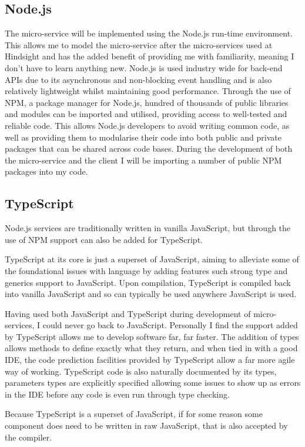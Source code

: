\subsection{Node.js}
The micro-service will be implemented using the Node.js run-time environment. This allows me to model the micro-service after the micro-services used at Hindsight and has the added benefit of providing me with familiarity, meaning I don't have to learn anything new. Node.js is used industry wide for back-end APIs due to its asynchronous and non-blocking event handling and is also relatively lightweight whilst maintaining good performance. Through the use of NPM, a package manager for Node.js, hundred of thousands of public libraries and modules can be imported and utilised, providing access to well-tested and reliable code. This allows Node.js developers to avoid writing common code, as well as providing them to modularise their code into both public and private packages that can be shared across code bases. During the development of both the micro-service and the client I will be importing a number of public NPM packages into my code.

\subsection{TypeScript}
Node.js services are traditionally written in vanilla JavaScript, but through the use of NPM support can also be added for TypeScript.

TypeScript at its core is just a superset of JavaScript, aiming to alleviate some of the foundational issues with language by adding features such strong type and generics support to JavaScript. Upon compilation, TypeScript is compiled back into vanilla JavaScript and so can typically be used anywhere JavaScript is used.

Having used both JavaScript and TypeScript during development of micro-services, I could never go back to JavaScript. Personally I find the support added by TypeScript allows me to develop software far, far faster. The addition of types allows methods to define exactly what they return, and when tied in with a good IDE, the code prediction facilities provided by TypeScript allow a far more agile way of working. TypeScript code is also naturally documented by its types, parameters types are explicitly specified allowing some issues to show up as errors in the IDE before any code is even run through type checking.

Because TypeScript is a superset of JavaScript, if for some reason some component does need to be written in raw JavaScript, that is also accepted by the compiler.
